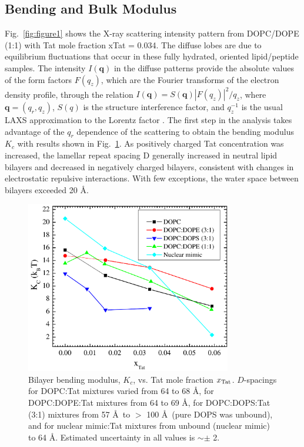 \subsection{Bending and Bulk Modulus}\label{sec:Kc_results}
Fig.~\ref{fig:figure1} shows the X-ray scattering intensity pattern from 
DOPC/DOPE (1:1) with Tat mole fraction \gls{xTat} = 0.034. The diffuse lobes are 
due to equilibrium fluctuations that occur in these fully hydrated, oriented 
lipid/peptide samples. The intensity $I(\mathbf{q})$ in the diffuse 
patterns provide the absolute values of the form factors $F(q_z)$, which are 
the Fourier transforms of the electron density 
profile, through the relation $I(\mathbf{q})=S(\mathbf{q})|F(q_z)|^2/q_z$, 
where $\mathbf{q}=(q_r,q_z)$, $S(q)$ is 
the structure
interference factor, and $q_z^{-1}$ is the usual LAXS approximation to the 
Lorentz factor \cite{Kucerka05_BPJ,Kucerka06,Kucerka05_JMB}.
The first step in the analysis takes advantage of the $q_r$ dependence of the 
scattering to obtain the
bending modulus $K_c$ with results shown in Fig.~\ref{fig:figure2}. 
As positively charged Tat concentration was increased, 
the lamellar repeat spacing \gls{D} generally increased in neutral lipid 
bilayers and decreased in negatively charged bilayers, consistent with changes in 
electrostatic repulsive interactions. 
With few exceptions, the water space between bilayers exceeded 20 \AA.

\begin{figure}[htbp]
  \centering
  \includegraphics[width=0.8\textwidth]{figures/Tat/NFIT_results/Kc}
  \caption[Bilayer bending modulus, $K_c$, vs. Tat mole fraction $\xTat$]
  {Bilayer bending modulus, $K_c$, vs. Tat mole fraction $\xTat$. 
  $D$-spacings for DOPC:Tat mixtures varied from 64 to 68 \AA, 
  for DOPC:DOPE:Tat mixtures from 64 to 69 \AA, 
  for DOPC:DOPS:Tat (3:1) mixtures from 57 \AA\ to $>$ 100 \AA\ (pure DOPS was unbound), 
  and for nuclear mimic:Tat mixtures from unbound (nuclear mimic) to 64 \AA. 
  Estimated uncertainty in all values is  $\sim\pm$ 2.}
  \label{fig:figure2}
\end{figure}

